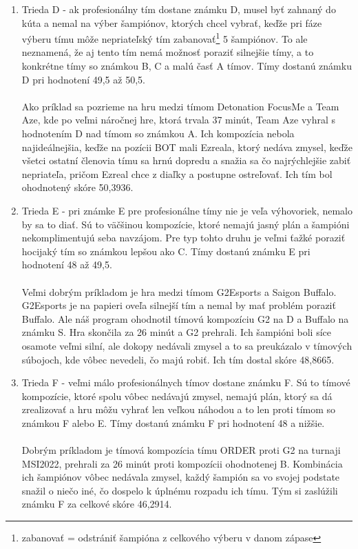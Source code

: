 \begin{enumerate}
	\\
	\item Trieda D  - ak profesionálny tím dostane známku D, musel byť zahnaný do kúta a nemal na výber šampiónov, ktorých chcel vybrať, keďže pri fáze výberu tímu môže nepriateľský tím zabanovať\footnote{zabanovať = odstrániť šampióna z celkového výberu v danom zápase} 5 šampiónov. To ale neznamená, že aj tento tím nemá možnosť poraziť silnejšie tímy, a to konkrétne tímy so známkou B, C a malú časť A tímov. Tímy dostanú známku D pri hodnotení 49,5 až 50,5.
	\\ \\ Ako príklad sa pozrieme na hru medzi tímom Detonation FocusMe a Team Aze, kde po veľmi náročnej hre, ktorá trvala 37 minút, Team Aze vyhral s hodnotením D nad tímom so známkou A. Ich kompozícia nebola najideálnejšia, keďže na pozícii BOT mali Ezreala, ktorý nedáva zmysel, keďže všetci ostatní členovia tímu sa hrnú dopredu a snažia sa čo najrýchlejšie zabiť nepriateľa, pričom Ezreal chce z diaľky a postupne ostreľovať. Ich tím bol ohodnotený skóre 50,3936.
	\\
	\item Trieda E  - pri známke E pre profesionálne tímy nie je veľa výhovoriek, nemalo by sa to diať. Sú to väčšinou kompozície, ktoré nemajú jasný plán a šampióni nekomplimentujú seba navzájom. Pre typ tohto druhu je veľmi ťažké poraziť hocijaký tím so známkou lepšou ako C. Tímy dostanú známku E pri hodnotení 48 až 49,5.
	\\ \\
	Veľmi dobrým príkladom je hra medzi tímom G2Esports a Saigon Buffalo. G2Esports je na papieri oveľa silnejší tím a nemal by mať problém poraziť Buffalo. Ale náš program ohodnotil tímovú kompozíciu G2 na D a Buffalo na známku S. Hra skončila za 26 minút a G2 prehrali. Ich šampióni boli síce osamote veľmi silní, ale dokopy nedávali zmysel a to sa preukázalo v tímových súbojoch, kde vôbec nevedeli, čo majú robiť. Ich tím dostal skóre 48,8665.
	\\
	\item Trieda F  - veľmi málo profesionálnych tímov dostane známku F. Sú to tímové kompozície, ktoré spolu vôbec nedávajú zmysel, nemajú plán, ktorý sa dá zrealizovať a hru môžu vyhrať len veľkou náhodou a to len proti tímom so známkou F alebo E. Tímy dostanú známku F pri hodnotení 48 a nižšie.
	\\ \\
	Dobrým príkladom je tímová kompozícia tímu ORDER proti G2 na turnaji MSI2022, prehrali za 26 minút proti kompozícii ohodnotenej B. Kombinácia ich šampiónov vôbec nedávala zmysel, každý šampión sa vo svojej podstate snažil o niečo iné, čo dospelo k úplnému rozpadu ich tímu. Tým si zaslúžili známku F za celkové skóre 46,2914.
	\\
\end{enumerate}


